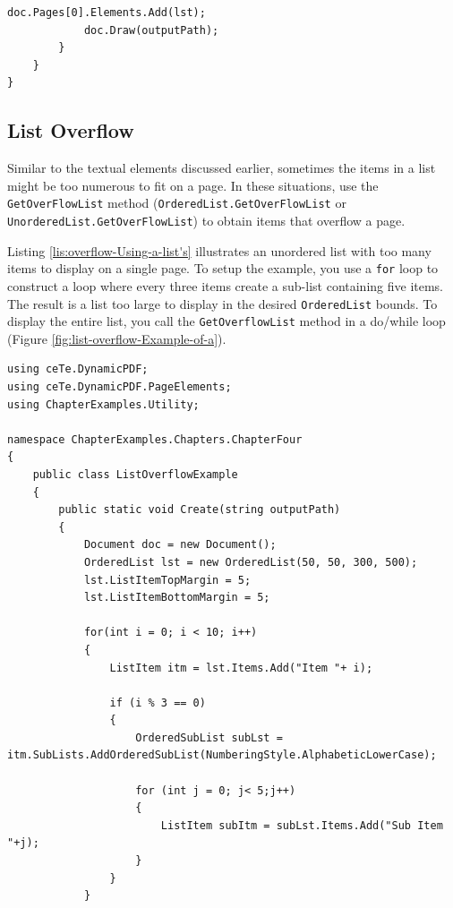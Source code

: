 \documentclass[american,letterpaper]{tufte-book}
\numberwithin{equation}{section}
\numberwithin{figure}{section}
\begin{document}
{{\begin{lstlisting}[caption={A combined ordered and unordered list.},label={lis:List-combining-ordered},basicstyle={\small\ttfamily},breaklines=true]
            doc.Pages[0].Elements.Add(lst);
            doc.Draw(outputPath);
        }
    }
}
\end{lstlisting}
\leavevmode\egroup


\subsection{List Overflow}

Similar to the textual elements discussed earlier, sometimes the items
in a list might be too numerous to fit on a page. In these situations,
use the \texttt{GetOverFlowList} method (\texttt{OrderedList.GetOverFlowList} or
\texttt{UnorderedList.GetOverFlowList}) to obtain items that overflow a page. 

Listing \ref{lis:overflow-Using-a-list's} illustrates an unordered
list with too many items to display on a single page. To setup the
example, you use a \texttt{for} loop to construct a
loop where every three items create a sub-list containing five items.
The result is a list too large to display in the desired \texttt{OrderedList}
bounds. To display the entire list, you call the \texttt{GetOverflowList}
method in a do/while loop (Figure \ref{fig:list-overflow-Example-of-a}).

\bgroup{}
\begin{lstlisting}[caption={Using a list's GetOverFlowList method.},label={lis:overflow-Using-a-list's},basicstyle={\small\ttfamily},breaklines=true]
using ceTe.DynamicPDF;
using ceTe.DynamicPDF.PageElements;
using ChapterExamples.Utility;

namespace ChapterExamples.Chapters.ChapterFour
{
    public class ListOverflowExample
    {
        public static void Create(string outputPath)
        {
            Document doc = new Document();
            OrderedList lst = new OrderedList(50, 50, 300, 500);
            lst.ListItemTopMargin = 5;
            lst.ListItemBottomMargin = 5;

            for(int i = 0; i < 10; i++)
            {
                ListItem itm = lst.Items.Add("Item "+ i);

                if (i % 3 == 0)
                {
                    OrderedSubList subLst = itm.SubLists.AddOrderedSubList(NumberingStyle.AlphabeticLowerCase);

                    for (int j = 0; j< 5;j++)
                    {
                        ListItem subItm = subLst.Items.Add("Sub Item "+j);
                    }
                }
            }
                       

\end{lstlisting}}}
\end{document}
